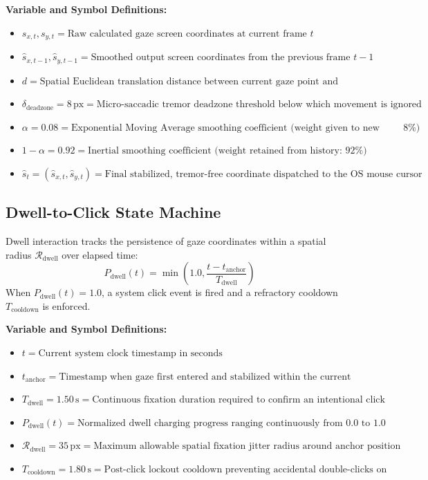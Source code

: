 \documentclass[11pt,a4paper]{article}
\begin{document}
\textbf{Variable and Symbol Definitions:}
\begin{itemize}
    \item $s_{x, t}, s_{y, t} = \text{Raw calculated gaze screen coordinates at current frame } t$
    \item $\hat{s}_{x, t-1}, \hat{s}_{y, t-1} = \text{Smoothed output screen coordinates from the previous frame } t-1$
    \item $d = \text{Spatial Euclidean translation distance between current gaze point and previous filtered coordinate}$
    \item $\delta_{\text{deadzone}} = 8\,\text{px} = \text{Micro-saccadic tremor deadzone threshold below which movement is ignored}$
    \item $\alpha = 0.08 = \text{Exponential Moving Average smoothing coefficient (weight given to new frame: } 8\%\text{)}$
    \item $1 - \alpha = 0.92 = \text{Inertial smoothing coefficient (weight retained from history: } 92\%\text{)}$
    \item $\hat{s}_t = (\hat{s}_{x, t}, \hat{s}_{y, t}) = \text{Final stabilized, tremor-free coordinate dispatched to the OS mouse cursor}$
\end{itemize}

\subsection{Dwell-to-Click State Machine}
Dwell interaction tracks the persistence of gaze coordinates within a spatial radius $\mathcal{R}_{\text{dwell}}$ over elapsed time:
\begin{equation}
P_{\text{dwell}}(t) = \min\left(1.0, \frac{t - t_{\text{anchor}}}{T_{\text{dwell}}}\right)
\end{equation}
When $P_{\text{dwell}}(t) = 1.0$, a system click event is fired and a refractory cooldown $T_{\text{cooldown}}$ is enforced.

\textbf{Variable and Symbol Definitions:}
\begin{itemize}
    \item $t = \text{Current system clock timestamp in seconds}$
    \item $t_{\text{anchor}} = \text{Timestamp when gaze first entered and stabilized within the current button/zone}$
    \item $T_{\text{dwell}} = 1.50\,\text{s} = \text{Continuous fixation duration required to confirm an intentional click selection}$
    \item $P_{\text{dwell}}(t) = \text{Normalized dwell charging progress ranging continuously from } 0.0 \text{ to } 1.0$
    \item $\mathcal{R}_{\text{dwell}} = 35\,\text{px} = \text{Maximum allowable spatial fixation jitter radius around anchor position}$
    \item $T_{\text{cooldown}} = 1.80\,\text{s} = \text{Post-click lockout cooldown preventing accidental double-clicks on neighboring keys}$
\end{itemize}
\end{document}

